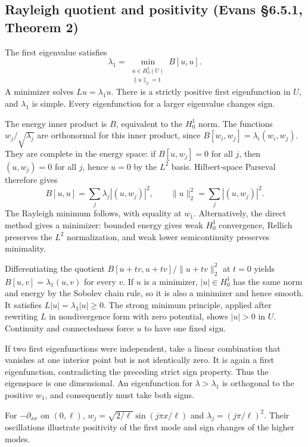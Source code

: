 \Needspace{35mm}
\subsection{Rayleigh quotient and positivity (Evans \S6.5.1, Theorem 2)}

\Needspace{45mm}
\begin{theorem}\label{thm:6-rayleigh}
The first eigenvalue satisfies
\[
 \lambda_1=\min_{\substack{u\in H^1_0(U)\\\|u\|_2=1}}B[u,u].
\]
A minimizer solves $Lu=\lambda_1u$. There is a strictly positive first
eigenfunction in $U$, and $\lambda_1$ is simple.
Every eigenfunction for a larger eigenvalue changes sign.
\end{theorem}
\begin{expandedproof}
The energy inner product is $B$, equivalent to the $H^1_0$ norm.
The functions $w_j/\sqrt{\lambda_j}$ are orthonormal for this inner product,
since $B[w_i,w_j]=\lambda_i(w_i,w_j)$.
They are complete in the energy space: if $B[u,w_j]=0$ for all $j$,
then $(u,w_j)=0$ for all $j$, hence $u=0$ by the $L^2$ basis.
Hilbert-space Parseval therefore gives
\begin{equation}\label{eq:6-energy-spectrum}
 B[u,u]=\sum_j\lambda_j|(u,w_j)|^2,\qquad
 \|u\|_2^2=\sum_j|(u,w_j)|^2 .
\end{equation}
The Rayleigh minimum follows, with equality at $w_1$.
Alternatively, the direct method gives a minimizer: bounded energy
gives weak $H^1_0$ convergence, Rellich preserves the $L^2$ normalization,
and weak lower semicontinuity preserves minimality.

Differentiating the quotient
$B[u+tv,u+tv]/\|u+tv\|_2^2$ at $t=0$ yields
$B[u,v]=\lambda_1(u,v)$ for every $v$.
If $u$ is a minimizer, $|u|\in H^1_0$ has the same norm and energy
by the Sobolev chain rule, so it is also a minimizer and hence smooth.
It satisfies $L|u|=\lambda_1|u|\geq0$.
The strong minimum principle, applied after rewriting $L$ in
nondivergence form with zero potential, shows $|u|>0$ in $U$.
Continuity and connectedness force $u$ to have one fixed sign.

If two first eigenfunctions were independent, take a linear combination
that vanishes at one interior point but is not identically zero.
It is again a first eigenfunction, contradicting the preceding strict
sign property. Thus the eigenspace is one dimensional.
An eigenfunction for $\lambda>\lambda_1$ is orthogonal to the positive
$w_1$, and consequently must take both signs.
\end{expandedproof}
\Needspace{45mm}
For $-\partial_{xx}$ on $(0,\ell)$,
$w_j=\sqrt{2/\ell}\sin(j\pi x/\ell)$ and
$\lambda_j=(j\pi/\ell)^2$. Their oscillations illustrate positivity
of the first mode and sign changes of the higher modes.


